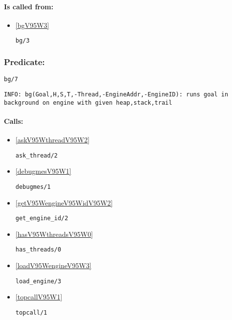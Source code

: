 \paragraph{Is called from:} 
\begin{itemize}
\item \ref{bgV95W3} 
\begin{verbatim}
bg/3
\end{verbatim}

\end{itemize}

\subsubsection{Predicate:} \label{bgV95W7}

\begin{verbatim}
bg/7
\end{verbatim}

{\small \begin{verbatim}
INFO: bg(Goal,H,S,T,-Thread,-EngineAddr,-EngineID): runs goal in background on engine with given heap,stack,trail

\end{verbatim}}
\paragraph{Calls:} 
\begin{itemize}
\item \ref{askV95WthreadV95W2} 
\begin{verbatim}
ask_thread/2
\end{verbatim}

\item \ref{debugmesV95W1} 
\begin{verbatim}
debugmes/1
\end{verbatim}

\item \ref{getV95WengineV95WidV95W2} 
\begin{verbatim}
get_engine_id/2
\end{verbatim}

\item \ref{hasV95WthreadsV95W0} 
\begin{verbatim}
has_threads/0
\end{verbatim}

\item \ref{loadV95WengineV95W3} 
\begin{verbatim}
load_engine/3
\end{verbatim}

\item \ref{topcallV95W1} 
\begin{verbatim}
topcall/1
\end{verbatim}

\end{itemize}
